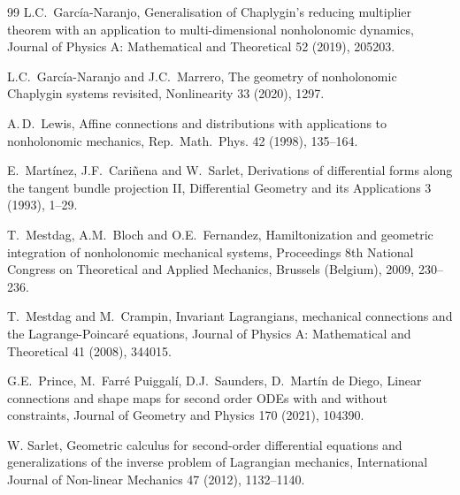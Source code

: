 \documentclass[11pt]{article}
\begin{document}
\begin{thebibliography}{99}
 L.C.\ Garc\'ia-Naranjo, Generalisation of Chaplygin's reducing multiplier theorem with an application to multi-dimensional nonholonomic dynamics,
Journal of Physics A: Mathematical and Theoretical 52 (2019), 205203.


 L.C.\ Garc\'ia-Naranjo and J.C.\ Marrero, The geometry of nonholonomic Chaplygin systems revisited,  Nonlinearity 33 (2020), 1297.

 A.\,D.\ Lewis, Affine connections and distributions with
applications to nonholonomic mechanics,  Rep.\ Math.\ Phys.  42  (1998), 135--164.




 E.\ Mart\'inez, J.F.\ Cari\~nena and W.\ Sarlet,
 Derivations of differential forms along the
tangent bundle projection II, Differential Geometry and its Applications 3 (1993), 1--29.

 T.\ Mestdag, A.M.\ Bloch and O.E.\ Fernandez, Hamiltonization and geometric integration of nonholonomic mechanical systems, Proceedings 8th National Congress on Theoretical and Applied Mechanics, Brussels (Belgium), 2009, 230--236.




 T.\ Mestdag and M.\ Crampin, Invariant Lagrangians, mechanical connections and the Lagrange-Poincar\'e equations,  Journal of Physics A: Mathematical and Theoretical  41 (2008), 344015.

 G.E.\ Prince, M.\ Farr\'e Puiggal\'i, D.J.\ Saunders, D.\ Mart\'in de Diego,
Linear connections and shape maps for second order ODEs with and without constraints,
Journal of Geometry and Physics 170 (2021), 104390.



 W. Sarlet, Geometric calculus for second-order differential equations
and generalizations of the inverse problem of Lagrangian
mechanics, International Journal of Non-linear Mechanics 47 (2012), 1132--1140.



\end{thebibliography}


 
\end{document}

